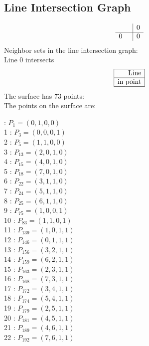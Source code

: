 \documentclass{article}
\begin{document}
{\subsection*{Line Intersection Graph}
{\arraycolsep=1pt
$$
\begin{array}{rr|*{1}r}
 &  & 0\\
\hline
0 &  & 0\\
\end{array}
$$
}%
Neighbor sets in the line intersection graph:\\
Line 0 intersects 
$$
\begin{array}{|r*{0}{|c}|}
\hline
\mbox{Line} \\
\hline
\mbox{in point} \\
\hline
\end{array}
$$
The surface has 73 points:\\
The points on the surface are:\\
\begin{multicols}{3}
 : $P_{1}=( 0, 1, 0, 0 )$\\
1 : $P_{3}=( 0, 0, 0, 1 )$\\
2 : $P_{5}=( 1, 1, 0, 0 )$\\
3 : $P_{13}=( 2, 0, 1, 0 )$\\
4 : $P_{15}=( 4, 0, 1, 0 )$\\
5 : $P_{18}=( 7, 0, 1, 0 )$\\
6 : $P_{22}=( 3, 1, 1, 0 )$\\
7 : $P_{24}=( 5, 1, 1, 0 )$\\
8 : $P_{25}=( 6, 1, 1, 0 )$\\
9 : $P_{75}=( 1, 0, 0, 1 )$\\
10 : $P_{83}=( 1, 1, 0, 1 )$\\
11 : $P_{139}=( 1, 0, 1, 1 )$\\
12 : $P_{146}=( 0, 1, 1, 1 )$\\
13 : $P_{156}=( 3, 2, 1, 1 )$\\
14 : $P_{159}=( 6, 2, 1, 1 )$\\
15 : $P_{163}=( 2, 3, 1, 1 )$\\
16 : $P_{168}=( 7, 3, 1, 1 )$\\
17 : $P_{172}=( 3, 4, 1, 1 )$\\
18 : $P_{174}=( 5, 4, 1, 1 )$\\
19 : $P_{179}=( 2, 5, 1, 1 )$\\
20 : $P_{181}=( 4, 5, 1, 1 )$\\
21 : $P_{189}=( 4, 6, 1, 1 )$\\
22 : $P_{192}=( 7, 6, 1, 1 )$\\

\end{multicols}}
\end{document}
